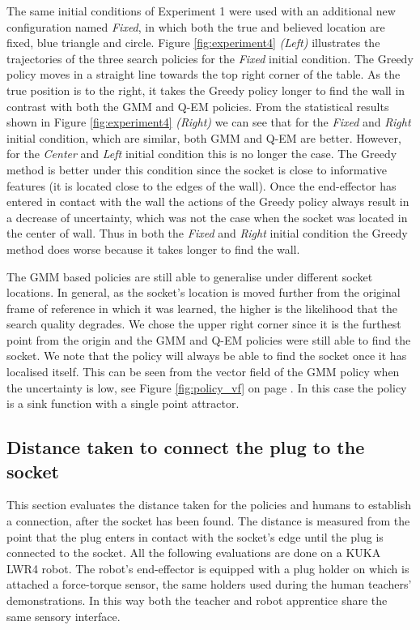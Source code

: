 \documentclass[final,5p,times,twocolumn]{elsarticle}
\begin{document}
The same initial conditions of Experiment 1 were used with an additional 
new configuration named \textit{Fixed}, in which both the true and believed location are fixed, blue triangle and circle.
Figure \ref{fig:experiment4} \textit{(Left)} illustrates the trajectories of the three search policies for the \textit{Fixed} initial condition. 
The Greedy policy moves in a straight line towards the top
right corner of the table. As the true position is to the right, it takes the Greedy policy longer to find the wall 
in contrast with both the GMM and Q-EM policies. From the statistical results shown in Figure \ref{fig:experiment4} \textit{(Right)} we can see
that for the \textit{Fixed} and \textit{Right} initial condition, which are similar, both GMM and Q-EM are better. However, for 
the \textit{Center} and \textit{Left} initial condition this is no longer the case. 
The Greedy method is better under this condition since the socket is close to informative features (it is located close to the edges of the wall). 
Once the end-effector has entered in contact with the wall the actions of the Greedy policy always result in a decrease of uncertainty, which was not the case when the socket was located in the center of wall. 
Thus in both the \textit{Fixed} and \textit{Right} initial condition the Greedy method does worse because it takes longer
to find the wall.

The GMM based policies are still able to generalise under different socket locations. In general, as the socket's location is moved 
further from the original frame of reference in which it was learned, the higher is the likelihood that the search quality degrades. We 
chose the upper right corner since it is the furthest point from the origin and the GMM and Q-EM policies were still able to find 
the socket. We note that the policy will always be able to find the socket once it has localised itself. This can be seen from the vector field 
of the GMM policy when the uncertainty is low, see Figure \ref{fig:policy_vf} on page \pageref{fig:policy_vf}. In this case the policy is a sink function 
with a single point attractor.


\subsection{Distance taken to connect the plug to the socket}

This section evaluates the distance taken for the policies and humans to establish a connection, after the socket 
has been found. The distance is measured from the point that the plug enters in contact with the socket's edge until 
the plug is connected to the socket. All the following evaluations are done on a KUKA LWR4 robot. The robot's end-effector 
is equipped with a plug holder on which is attached a force-torque sensor, the same holders used during the 
human teachers' demonstrations. In this way both the teacher and robot apprentice share the same sensory interface.
\end{document}
